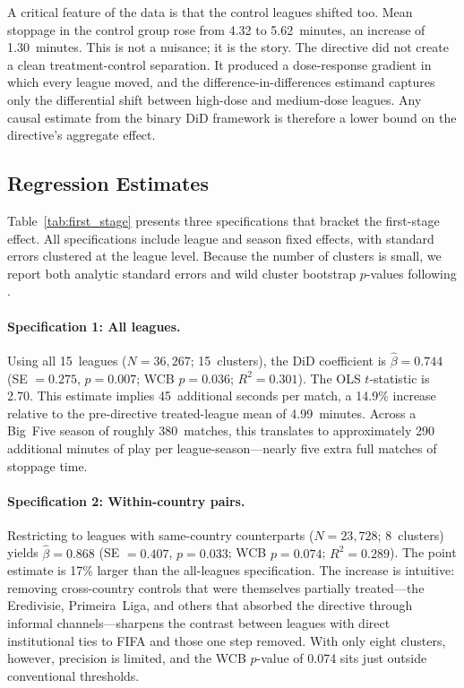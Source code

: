 A critical feature of the data is that the control leagues shifted too.
Mean stoppage in the control group rose from 4.32 to 5.62~minutes, an
increase of 1.30~minutes. This is not a nuisance; it is the story.
The directive did not create a clean treatment-control separation. It
produced a dose-response gradient in which every league moved, and the
difference-in-differences estimand captures only the differential shift
between high-dose and medium-dose leagues. Any causal estimate from the
binary DiD framework is therefore a lower bound on the directive's
aggregate effect.


\subsection{Regression Estimates}
\label{sec:regression}



Table~\ref{tab:first_stage} presents three specifications that bracket
the first-stage effect. All specifications include league and season
fixed effects, with standard errors clustered at the league level.
Because the number of clusters is small, we report both analytic
standard errors and wild cluster bootstrap $p$-values following
\citet{cameron2008bootstrap}.

\paragraph{Specification 1: All leagues.} Using all 15~leagues
($N = 36{,}267$; 15~clusters), the DiD coefficient is $\hat\beta =
0.744$ (SE $= 0.275$, $p = 0.007$; WCB $p = 0.036$; $R^2 = 0.301$).
The OLS $t$-statistic is 2.70. This estimate implies 45~additional
seconds per match, a 14.9\% increase relative to the pre-directive
treated-league mean of 4.99~minutes. Across a Big~Five season of
roughly 380~matches, this translates to approximately 290 additional
minutes of play per league-season---nearly five extra full matches of
stoppage time.

\paragraph{Specification 2: Within-country pairs.} Restricting to
leagues with same-country counterparts ($N = 23{,}728$; 8~clusters)
yields $\hat\beta = 0.868$ (SE $= 0.407$, $p = 0.033$; WCB $p =
0.074$; $R^2 = 0.289$). The point estimate is 17\% larger than the
all-leagues specification. The increase is intuitive: removing
cross-country controls that were themselves partially treated---the
Eredivisie, Primeira~Liga, and others that absorbed the directive
through informal channels---sharpens the contrast between leagues
with direct institutional ties to FIFA and those one step removed.
With only eight clusters, however, precision is limited, and the WCB
$p$-value of 0.074 sits just outside conventional thresholds.

